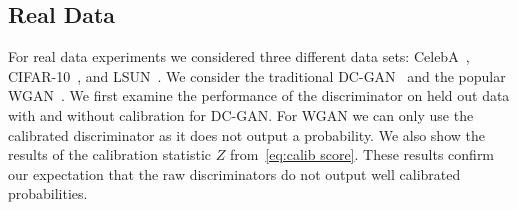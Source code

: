\documentclass{article}
\begin{document}
\subsection{Real Data}
For real data experiments we considered three different data sets: CelebA~\citep{Liu2015}, CIFAR-10~\citep{Torralba2008}, and LSUN~\citep{Yu2015}.
We consider the traditional DC-GAN~\citep{Radford2015} and the popular WGAN~\citep{Arjovsky2017}\@.
We first examine the performance of the discriminator on held out data with and without calibration for DC-GAN\@.
For WGAN we can only use the calibrated discriminator as it does not output a probability.
We also show the results of the calibration statistic $Z$ from~\eqref{eq:calib score}.
These results confirm our expectation that the raw discriminators do not output well calibrated probabilities.
\end{document}
